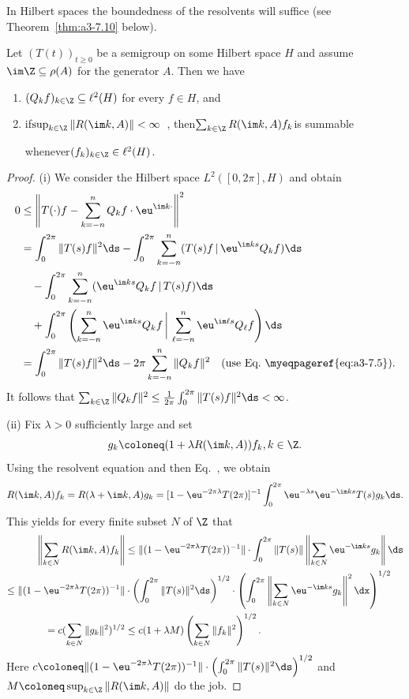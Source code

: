In Hilbert spaces the boundedness of the resolvents will suffice (see Theorem~\ref{thm:a3-7.10} below).
\begin{lemma}\label{lem:a3-7.9}
Let $(T(t))_{t\geq 0}$ be a semigroup on some Hilbert space $H$ and assume $\im\Z \subseteq \rho(A)$ for the generator $A$.
Then we have
\begin{enumerate}[\upshape (i)]
\item 
$(Q_{k}f)_{k\in\Z} \subseteq \ell^{2}(H)$ for every $f \in H$, and

\item 
if\quad $\sup_{k\in\Z}\|R(\im k,A)\| < \infty$~, then\quad $\sum_{k\in\Z} R(\im k,A)f_{k}$\quad is summable 

whenever\quad $(f_{k})_{k\in\Z} \in \ell^{2}(H)$. 
\end{enumerate}
\end{lemma}
\begin{proof}
(i) We consider the Hilbert space $L^{2}([0,2\pi],H)$ and obtain
\begin{align*}
0 &\leq \left\|T(\cdot)f - \sum_{k=-n}^{n} Q_{k}f\cdot \eu^{\im k\cdot}\right\|^{2} \\
&= \int_{0}^{2\pi} \|T(s)f\|^{2} \ds 
   - \int_{0}^{2\pi} \sum_{k=-n}^{n} (T(s)f \,\vert\, \eu^{\im ks}Q_{k}f) \ds \\
&\quad - \int_{0}^{2\pi} \sum_{k=-n}^{n} (\eu^{\im ks}Q_{k}f  \,\vert\, T(s)f) \ds \\
&\quad + \int_{0}^{2\pi} \left(\sum_{k=-n}^{n} \eu^{\im ks}Q_{k}f
        \,\bigg\vert\,  \sum_{\ell=-n}^{n} \eu^{\im \ell s}Q_{\ell}f\right) \ds \\
&= \int_{0}^{2\pi} \|T(s)f\|^{2} \ds - 2\pi\sum_{k=-n}^{n} \|Q_{k}f\|^{2}
   \quad \text{(use Eq.~\myeqpageref{eq:a3-7.5})}.
\end{align*}
It follows that $\sum_{k\in\Z} \|Q_{k}f\|^{2} \leq \frac{1}{2\pi}\int_{0}^{2\pi} \|T(s)f\|^{2} \ds < \infty$.

(ii) Fix $\lambda > 0$ sufficiently large and set 
\[
g_{k}\coloneq (1 + \lambda R(\im k,A))f_{k}, k \in \Z .
\]
Using the resolvent equation and then Eq.~, we obtain
\[
R(\im k,A)f_{k} = R(\lambda + \im k,A)g_{k} = [1 - \eu^{-2\pi\lambda}T(2\pi)]^{-1}\int_{0}^{2\pi} \eu^{-\lambda s}\eu^{-\im ks}T(s)g_{k} \ds .
\]
This yields for every finite subset $N$ of\/ $\Z$ that
\begin{align*}
	\left\|\sum_{k\in N} R(\im k,A)f_{k}\right\| & 
		\leq \|(1 - \eu^{-2\pi\lambda}T(2\pi))^{-1}\|\cdot\int_{0}^{2\pi} \|T(s)\| 
			\left\|\sum_{k\in N} \eu^{-\im ks}g_{k}\right\| \ds
\\
	\leq \|(1 - \eu^{-2\pi\lambda}T(2\pi))^{-1}\| & \cdot 
	\left(\int_{0}^{2\pi}\|T(s)\|^{2} \ds\right)^{1/2} \cdot \left(\int_{0}^{2\pi}\left\|\sum_{k\in N} 
	\eu^{-\im ks}g_{k}\right\|^{2} \dx \right)^{1/2}
\\
	= c(\sum_{k\in N} \|g_{k}\|^{2})^{1/2} & \leq c(1 + \lambda M)\left(\sum_{k\in N} \|f_{k}\|^{2}\right)^{1/2} .
\end{align*}
Here $c\coloneq \|(1 - \eu^{-2\pi\lambda}T(2\pi))^{-1}\|\cdot\left(\int_{0}^{2\pi}\|T(s)\|^{2} \ds\right)^{1/2}$ and $M\coloneq \sup_{k\in\Z}\|R(\im k,A)\|$ do the job.
\end{proof}
